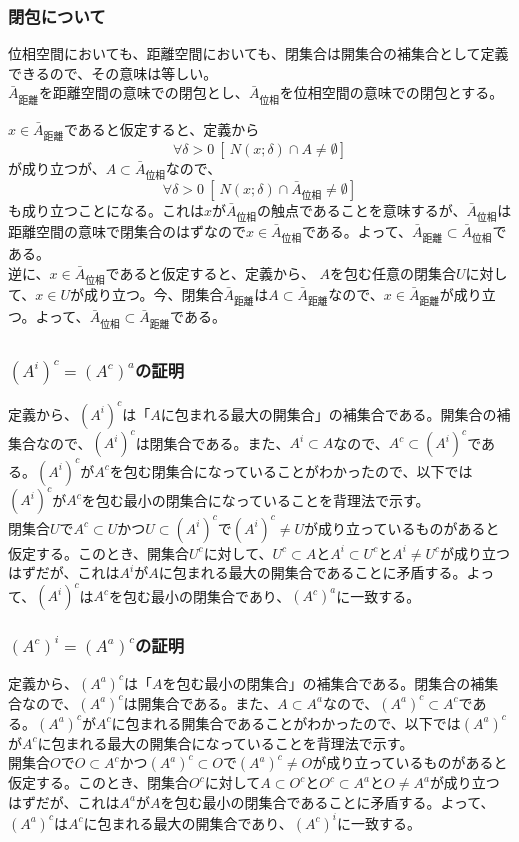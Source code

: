 \documentclass{jsarticle}
\begin{document}
\subsubsection{閉包について}
位相空間においても、距離空間においても、閉集合は開集合の補集合として定義できるので、その意味は等しい。\\
$\bar{A}_{距離}$を距離空間の意味での閉包とし、$\bar{A}_{位相}$を位相空間の意味での閉包とする。

$x\in\bar{A}_{距離}$であると仮定すると、定義から
\[\forall\delta>0\ [\ N(x;\delta)\cap A\neq\emptyset]\]
が成り立つが、$A\subset\bar{A}_{位相}$なので、
\[\forall\delta>0\ [\ N(x;\delta)\cap \bar{A}_{位相}\neq\emptyset]\]
も成り立つことになる。これは$x$が$\bar{A}_{位相}$の触点であることを意味するが、$\bar{A}_{位相}$は距離空間の意味で閉集合のはずなので$x\in\bar{A}_{位相}$である。よって、$\bar{A}_{距離}\subset\bar{A}_{位相}$である。\\
逆に、$x\in\bar{A}_{位相}$であると仮定すると、定義から、
$A$を包む任意の閉集合$U$に対して、$x\in U$が成り立つ。今、閉集合$\bar{A}_{距離}$は$A\subset\bar{A}_{距離}$なので、$x\in\bar{A}_{距離}$が成り立つ。よって、$\bar{A}_{位相}\subset\bar{A}_{距離}$である。



\subsection{}
\subsubsection{$(A^i)^c=(A^c)^a$の証明}
定義から、$(A^i)^c$は「$A$に包まれる最大の開集合」の補集合である。開集合の補集合なので、$(A^i)^c$は閉集合である。また、$A^i\subset A$なので、$A^c\subset (A^i)^c$である。$(A^i)^c$が$A^c$を包む閉集合になっていることがわかったので、以下では$(A^i)^c$が$A^c$を包む最小の閉集合になっていることを背理法で示す。\\
閉集合$U$で$A^c\subset U$かつ$U\subset(A^i)^c$で$(A^i)^c\neq U$が成り立っているものがあると仮定する。このとき、開集合$U^c$に対して、$U^c\subset A$と$A^i\subset U^c$と$A^i\neq U^c$が成り立つはずだが、これは$A^i$が$A$に包まれる最大の開集合であることに矛盾する。よって、$(A^i)^c$は$A^c$を包む最小の閉集合であり、$(A^c)^a$に一致する。

\subsubsection{$(A^c)^i=(A^a)^c$の証明}
定義から、$(A^a)^c$は「$A$を包む最小の閉集合」の補集合である。閉集合の補集合なので、$(A^a)^c$は開集合である。また、$A\subset A^a$なので、$(A^a)^c\subset A^c$である。$(A^a)^c$が$A^c$に包まれる開集合であることがわかったので、以下では$(A^a)^c$が$A^c$に包まれる最大の開集合になっていることを背理法で示す。\\
開集合$O$で$O\subset A^c$かつ$(A^a)^c\subset O$で$(A^a)^c\neq O$が成り立っているものがあると仮定する。このとき、閉集合$O^c$に対して$A\subset O^c$と$O^c\subset A^a$と$O\neq A^a$が成り立つはずだが、これは$A^a$が$A$を包む最小の閉集合であることに矛盾する。よって、$(A^a)^c$は$A^c$に包まれる最大の開集合であり、$(A^c)^i$に一致する。
\end{document}
